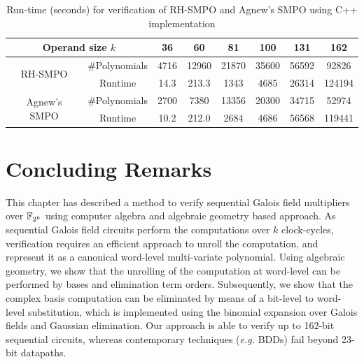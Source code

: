 \begin{table}[bp]
\centering
\caption{\small Run-time (seconds) for verification of
  RH-SMPO and Agnew's SMPO using C++ implementation}
\label{tab:Cpp}
{\small 
\begin{tabular}{|c|c||c|c|c|c|c|c|}
\hline
\multicolumn{2}{|c||}{\centering Operand size $k$} & 36 & 60 & 81 & 100 & 131 & 162 \\
\hline
\multirow{2}{2cm}{\centering RH-SMPO} & \#Polynomials & 4716 & 12960 & 21870 & 35600 & 56592 & 92826 \\
\cline{2-8}
 & Runtime & 14.3 & 213.3 & 1343 & 4685 & 26314 & 124194 \\
\hline
\multirow{2}{2cm}{\centering Agnew's SMPO} & \#Polynomials & 2700 & 7380 & 13356 & 20300 & 34715 & 52974 \\
\cline{2-8}
 & Runtime & 10.2 & 212.0 & 2684 & 4686 & 56568 & 119441 \\
 
 \hline

 
\end{tabular}
}
\end{table}


\section{Concluding Remarks}

This chapter has described a method to verify sequential Galois field
multipliers over ${\mathbb{F}}_{2^k}$ using computer algebra and algebraic geometry
based approach. As sequential Galois field circuits perform the
computations over $k$ clock-cycles, verification requires an efficient
approach to unroll the computation, and represent it as a canonical
word-level multi-variate polynomial. Using algebraic geometry, we show
that the unrolling of the computation at word-level can be performed by
\Grobner bases and elimination term orders. Subsequently, we show
that the complex \Grobner basis computation can be eliminated by means
of a bit-level to word-level substitution, which is implemented using
the binomial expansion over Galois fields and Gaussian
elimination. Our approach is able to verify up to 162-bit sequential
circuits, whereas contemporary techniques ({\it e.g.} BDDs) fail beyond 23-bit
datapaths.  

